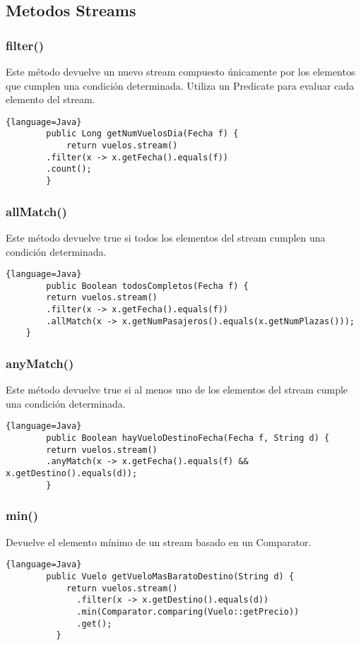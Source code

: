 \begin{center}
\begin{itemize}
	\end{itemize}

	\subsection{Metodos Streams}

	\subsubsection{filter()}
	Este método devuelve un nuevo stream compuesto únicamente por los elementos que cumplen
	una condición determinada. Utiliza un Predicate para evaluar cada elemento del stream.
	\begin{lstlisting}{language=Java}
        public Long getNumVuelosDia(Fecha f) {
            return vuelos.stream()
        .filter(x -> x.getFecha().equals(f))
        .count();
        }  
    \end{lstlisting}

	\subsubsection{allMatch()}
	Este método devuelve true si todos los elementos del stream cumplen una condición determinada.
	\begin{lstlisting}{language=Java}
        public Boolean todosCompletos(Fecha f) {
        return vuelos.stream()
        .filter(x -> x.getFecha().equals(f))
        .allMatch(x -> x.getNumPasajeros().equals(x.getNumPlazas()));
    }
\end{lstlisting}

	\subsubsection{anyMatch()}
	Este método devuelve true si al menos uno de los elementos del stream cumple una condición determinada.
	\begin{lstlisting}{language=Java}
        public Boolean hayVueloDestinoFecha(Fecha f, String d) {
        return vuelos.stream()
        .anyMatch(x -> x.getFecha().equals(f) && x.getDestino().equals(d));
        }
    \end{lstlisting}

	\subsubsection{min()}
	Devuelve el elemento mínimo de un stream basado en un Comparator.
	\begin{lstlisting}{language=Java}
        public Vuelo getVueloMasBaratoDestino(String d) {
            return vuelos.stream()
              .filter(x -> x.getDestino().equals(d))
              .min(Comparator.comparing(Vuelo::getPrecio))
              .get();
          }
          

\end{lstlisting}
\end{center}
